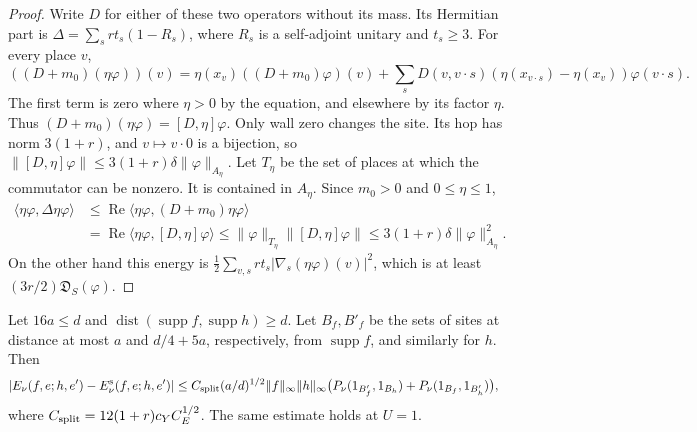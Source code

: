 \documentclass[11pt,letterpaper,reqno]{amsart}
\makeatletter
\theoremstyle{definition}
\newcommand{\ms@minorstart}{%
  \pushQED{\qed}\renewcommand{\qedsymbol}{$\blacksquare$}}
\newenvironment{lemma}[1][]{\ms@minorstart\ms@lemma[#1]}
  {\popQED\endms@lemma}
\theoremstyle{remark}
\makeatother
\begin{document}
\begin{proof}
Write $D$ for either of these two operators without its
mass.  Its Hermitian part is
$\Delta=\sum_srt_s(1-R_s)$, where $R_s$ is a self-adjoint
unitary and $t_s\ge3$. For every place $v$,
\[
 ((D+m_0)(\eta\varphi))(v)
 =\eta(x_v)((D+m_0)\varphi)(v)
 +\sum_sD(v,v\cdot s)
       (\eta(x_{v\cdot s})-\eta(x_v))\varphi(v\cdot s).
\]
The first term is zero where $\eta>0$ by the equation,
and elsewhere by its factor $\eta$. Thus
$(D+m_0)(\eta\varphi)=[D,\eta]\varphi$.
Only wall zero changes the site.  Its hop has norm
$3(1+r)$, and $v\mapsto v\cdot0$ is a bijection, so
$\|[D,\eta]\varphi\|\le3(1+r)\delta
\|\varphi\|_{A_\eta}$. Let $T_\eta$ be the set of places
at which the commutator can be nonzero. It is contained
in $A_\eta$. Since $m_0>0$ and $0\le\eta\le1$,
\begin{align*}
 \langle\eta\varphi,\Delta\eta\varphi\rangle
 &\le\operatorname{Re}
       \langle\eta\varphi,(D+m_0)\eta\varphi\rangle\\
 &=\operatorname{Re}\langle\eta\varphi,[D,\eta]\varphi\rangle
 \le\|\varphi\|_{T_\eta}\|[D,\eta]\varphi\|
 \le3(1+r)\delta\|\varphi\|_{A_\eta}^2.
\end{align*}
On the other hand this energy is
$\frac12\sum_{v,s}rt_s|\nabla_s(\eta\varphi)(v)|^2$,
which is at least $(3r/2)\mathfrak D_S(\varphi)$.
\end{proof}

\begin{lemma}[Point splitting]\label{C-417-6}
Let $16a\le d$ and
$\operatorname{dist}(\operatorname{supp}f,
\operatorname{supp}h)\ge d$.  Let $B_f,B'_f$ be the sets
of sites at distance at most $a$ and $d/4+5a$, respectively,
from $\operatorname{supp}f$, and similarly for $h$.
Then
\begin{align}
 |E_\nu(f,e;h,e')-E_\nu^{\rm s}(f,e;h,e')|
 &\le C_{\rm split}(a/d)^{1/2}\|f\|_\infty\|h\|_\infty
       \bigl(P_\nu(1_{B'_f},1_{B_h})
                      +P_\nu(1_{B_f},1_{B'_h})\bigr),
 \label{eq:qcdm2-point-splitting}
\end{align}
where $C_{\rm split}=12(1+r)c_YC_E^{1/2}$.
The same estimate holds at $U=1$.
\end{lemma}
\end{document}

